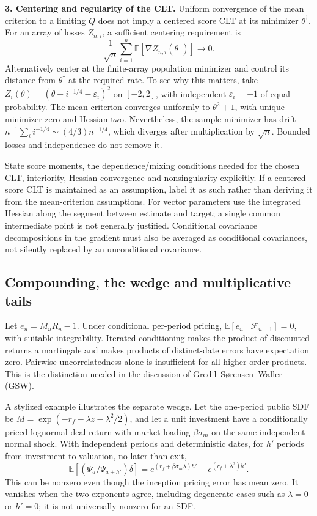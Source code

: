 \documentclass[11pt]{article}
\newcommand{\E}{\mathbb{E}}
\theoremstyle{plain}
\theoremstyle{definition}
\begin{document}
\textbf{3. Centering and regularity of the CLT.} Uniform convergence of the mean criterion to a limiting $Q$ does not imply a centered score CLT at its minimizer $\theta^\dagger$. For an array of losses $Z_{n,i}$, a sufficient centering requirement is
\[
\frac{1}{\sqrt n}\sum_{i=1}^n\E[\nabla Z_{n,i}(\theta^\dagger)]\longrightarrow0.
\]
Alternatively center at the finite-array population minimizer and control its distance from $\theta^\dagger$ at the required rate. To see why this matters, take $Z_i(\theta)=(\theta-i^{-1/4}-\varepsilon_i)^2$ on $[-2,2]$, with independent $\varepsilon_i=\pm1$ of equal probability. The mean criterion converges uniformly to $\theta^2+1$, with unique minimizer zero and Hessian two. Nevertheless, the sample minimizer has drift $n^{-1}\sum_i i^{-1/4}\sim(4/3)n^{-1/4}$, which diverges after multiplication by $\sqrt n$. Bounded losses and independence do not remove it.

State score moments, the dependence/mixing conditions needed for the chosen CLT, interiority, Hessian convergence and nonsingularity explicitly. If a centered score CLT is maintained as an assumption, label it as such rather than deriving it from the mean-criterion assumptions. For vector parameters use the integrated Hessian along the segment between estimate and target; a single common intermediate point is not generally justified. Conditional covariance decompositions in the gradient must also be averaged as conditional covariances, not silently replaced by an unconditional covariance.

\subsection{Compounding, the wedge and multiplicative tails}
\label{sec:auditE}

Let $e_u=M_uR_u-1$. Under conditional per-period pricing, $\E[e_u\mid\mathcal F_{u-1}]=0$, with suitable integrability. Iterated conditioning makes the product of discounted returns a martingale and makes products of distinct-date errors have expectation zero. Pairwise uncorrelatedness alone is insufficient for all higher-order products. This is the distinction needed in the discussion of Gredil--S{\o}rensen--Waller (GSW).

A stylized example illustrates the separate wedge. Let the one-period public SDF be $M=\exp(-r_f-\lambda z-\lambda^2/2)$, and let a unit investment have a conditionally priced lognormal deal return with market loading $\beta\sigma_m$ on the same independent normal shock. With independent periods and deterministic dates, for $h'$ periods from investment to valuation, no later than exit,
\[
\E[(\Psi_a/\Psi_{a+h'})\delta]
=e^{(r_f+\beta\sigma_m\lambda)h'}-e^{(r_f+\lambda^2)h'}.
\]
This can be nonzero even though the inception pricing error has mean zero. It vanishes when the two exponents agree, including degenerate cases such as $\lambda=0$ or $h'=0$; it is not universally nonzero for an SDF.
\end{document}
